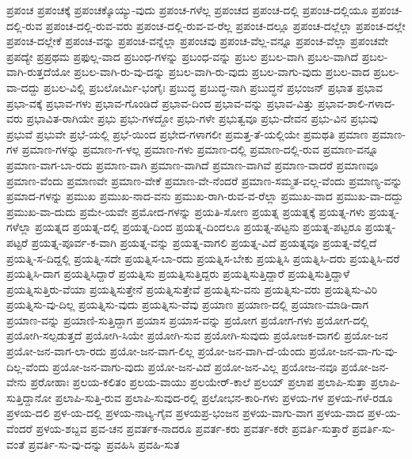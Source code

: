 ಪ್ರಪಂಚ
ಪ್ರಪಂಚಕ್ಕೆ
ಪ್ರಪಂಚಕ್ಕೊಯ್ಯು-ವುದು
ಪ್ರಪಂಚ-ಗಳೆಲ್ಲ
ಪ್ರಪಂಚದ
ಪ್ರಪಂಚ-ದಲ್ಲಿ
ಪ್ರಪಂಚ-ದಲ್ಲಿಯೂ
ಪ್ರಪಂಚ-ದಲ್ಲಿ-ರುವ
ಪ್ರಪಂಚ-ದಲ್ಲಿ-ರುವ-ವರು
ಪ್ರಪಂಚ-ದಲ್ಲಿ-ರುವ-ವ-ರೆಲ್ಲ
ಪ್ರಪಂಚ-ದಲ್ಲೂ
ಪ್ರಪಂಚ-ದಲ್ಲೆಲ್ಲಾ
ಪ್ರಪಂಚ-ದಲ್ಲೇ
ಪ್ರಪಂಚ-ದಲ್ಲೇಕೆ
ಪ್ರಪಂಚ-ವನ್ನು
ಪ್ರಪಂಚ-ವನ್ನೆಲ್ಲಾ
ಪ್ರಪಂಚವು
ಪ್ರಪಂಚ-ವೆಲ್ಲ-ವನ್ನೂ
ಪ್ರಪಂಚ-ವೆಲ್ಲಾ
ಪ್ರಪಂಚವೇ
ಪ್ರಪದ್ಯೇ
ಪ್ರಪ್ರಥಮ
ಪ್ರಫುಲ್ಲ-ವಾದ
ಪ್ರಬಂಧ-ಗಳನ್ನು
ಪ್ರಬಂಧ-ವನ್ನು
ಪ್ರಬಲ
ಪ್ರಬಲ-ವಾಗಿ
ಪ್ರಬಲ-ವಾಗಿದೆ
ಪ್ರಬಲ-ವಾಗಿ-ರುತ್ತದೆಯೋ
ಪ್ರಬಲ-ವಾಗಿ-ರು-ವು-ದನ್ನು
ಪ್ರಬಲ-ವಾಗಿ-ರು-ವುದು
ಪ್ರಬಲ-ವಾಗು-ವುದು
ಪ್ರಬಲ-ವಾದ
ಪ್ರಬಲ-ವಾ-ದದ್ದು
ಪ್ರಬಲ-ವಿಲ್ಲಿ
ಪ್ರಬಲೋರ್ಮಿ-ಭಂಗೈಃ
ಪ್ರಬುದ್ಧ
ಪ್ರಬುದ್ಧ-ನಾಗಿ
ಪ್ರಬುದ್ಧನೆ
ಪ್ರಭಂಜನ್
ಪ್ರಭಾತ
ಪ್ರಭಾವ
ಪ್ರಭಾ-ವಕ್ಕೆ
ಪ್ರಭಾವ-ಗಳು
ಪ್ರಭಾವ-ಗೊಂಡಿದೆ
ಪ್ರಭಾವ-ದಿಂದ
ಪ್ರಭಾವ-ವನ್ನು
ಪ್ರಭಾವ-ವಿತ್ತು
ಪ್ರಭಾವ-ಶಾಲಿ-ಗಳಾದ-ವರು
ಪ್ರಭಾವಿತ-ರಾಗಿಯೇ
ಪ್ರಭು
ಪ್ರಭು-ಗಳದ್ದೋ
ಪ್ರಭು-ಗಳೇ
ಪ್ರಭುತ್ವವೂ
ಪ್ರಭು-ದೇವನ
ಪ್ರಭು-ವಿನ
ಪ್ರಭುವು
ಪ್ರಭುವೆ
ಪ್ರಭುವೇ
ಪ್ರಭೆ-ಯಲ್ಲಿ
ಪ್ರಭೆ-ಯಿಂದ
ಪ್ರಭೇದ-ಗಳಾಗಲೀ
ಪ್ರಮತ್ತ-ತೆ-ಯಲ್ಲಿಯೇ
ಪ್ರಮಥತಿ
ಪ್ರಮಾಣ
ಪ್ರಮಾಣ-ಗಳ
ಪ್ರಮಾಣ-ಗಳನ್ನು
ಪ್ರಮಾಣ-ಗ-ಳಲ್ಲ
ಪ್ರಮಾಣ-ಗಳು
ಪ್ರಮಾಣ-ದಲ್ಲಿ
ಪ್ರಮಾಣ-ದಲ್ಲಿ-ರುವ
ಪ್ರಮಾಣ-ವನ್ನೂ
ಪ್ರಮಾಣ-ವಾಗ-ಬಾ-ರದು
ಪ್ರಮಾಣ-ವಾಗಿ
ಪ್ರಮಾಣ-ವಾಗಿದೆ
ಪ್ರಮಾಣ-ವಾಗಿವೆ
ಪ್ರಮಾಣ-ವಾದರೆ
ಪ್ರಮಾಣವೂ
ಪ್ರಮಾಣ-ವೆಂದು
ಪ್ರಮಾಣವೇ
ಪ್ರಮಾಣ-ವೇಕೆ
ಪ್ರಮಾಣ-ವೇ-ನೆಂದರೆ
ಪ್ರಮಾಣ-ಸಮ್ಮತ-ವಲ್ಲ-ವೆಂದು
ಪ್ರಮಾಣ್ಯ-ವನ್ನು
ಪ್ರಮಾದ-ಗಳನ್ನು
ಪ್ರಮುಖ
ಪ್ರಮುಖ-ನಾದ-ವನು
ಪ್ರಮುಖ-ರಾಗಿ-ರುವ-ವ-ರೆಲ್ಲಾ
ಪ್ರಮುಖ-ವಾದ
ಪ್ರಮುಖ-ವಾ-ದದ್ದು
ಪ್ರಮುಖ-ವಾ-ದುದು
ಪ್ರಮೇ-ಯವೇ
ಪ್ರಮೋದ-ಗಳನ್ನು
ಪ್ರಯತಿ-ಸೋಣ
ಪ್ರಯತ್ನ
ಪ್ರಯತ್ನಕ್ಕೆ
ಪ್ರಯತ್ನ-ಗಳು
ಪ್ರಯತ್ನ-ಗಳೆಲ್ಲಾ
ಪ್ರಯತ್ನದ
ಪ್ರಯತ್ನ-ದಲ್ಲಿ
ಪ್ರಯತ್ನ-ದಿಂದ
ಪ್ರಯತ್ನ-ದಿಂದಲೂ
ಪ್ರಯತ್ನ-ಪಟ್ಟನು
ಪ್ರಯತ್ನ-ಪಟ್ಟರೂ
ಪ್ರಯತ್ನ-ಪಟ್ಟರೆ
ಪ್ರಯತ್ನ-ಪೂರ್ವ-ಕ-ವಾಗಿ
ಪ್ರಯತ್ನ-ವನ್ನು
ಪ್ರಯತ್ನ-ವಾಗಲಿ
ಪ್ರಯತ್ನ-ವಿದೆ
ಪ್ರಯತ್ನವೂ
ಪ್ರಯತ್ನ-ವೆಲ್ಲಿದೆ
ಪ್ರಯತ್ನಿ-ಸ-ದಿದ್ದಲ್ಲಿ
ಪ್ರಯತ್ನಿ-ಸದೇ
ಪ್ರಯತ್ನಿಸ-ಬಾ-ರದು
ಪ್ರಯತ್ನಿಸ-ಬೇಕು
ಪ್ರಯತ್ನಿಸಿ
ಪ್ರಯತ್ನಿಸಿ-ದರು
ಪ್ರಯತ್ನಿಸಿ-ದರೆ
ಪ್ರಯತ್ನಿಸಿ-ದಾಗ
ಪ್ರಯತ್ನಿಸಿದ್ದಾರೆ
ಪ್ರಯತ್ನಿಸು
ಪ್ರಯತ್ನಿಸುತ್ತಿದ್ದರು
ಪ್ರಯತ್ನಿಸುತ್ತಿದ್ದಾರೆ
ಪ್ರಯತ್ನಿಸುತ್ತಿದ್ದಾಳೆ
ಪ್ರಯತ್ನಿಸುತ್ತಿರು-ವೆಯಾ
ಪ್ರಯತ್ನಿಸುತ್ತೇನೆ
ಪ್ರಯತ್ನಿಸುತ್ತೇವೆ
ಪ್ರಯತ್ನಿಸು-ವನು
ಪ್ರಯತ್ನಿಸು-ವರು
ಪ್ರಯತ್ನಿಸು-ವಿರಿ
ಪ್ರಯತ್ನಿಸು-ವು-ದಿಲ್ಲ
ಪ್ರಯತ್ನಿಸು-ವುದು
ಪ್ರಯತ್ನಿಸು-ವೆವು
ಪ್ರಯಾಣ
ಪ್ರಯಾಣ-ದಲ್ಲಿ
ಪ್ರಯಾಣ-ಮಾಡಿ-ದಾಗ
ಪ್ರಯಾಣ-ವನ್ನು
ಪ್ರಯಾಣಿ-ಸುತ್ತಿದ್ದಾಗ
ಪ್ರಯಾಸ
ಪ್ರಯಾಸ-ವನ್ನು
ಪ್ರಯೋಗ
ಪ್ರಯೋಗ-ಗಳು
ಪ್ರಯೋಗ-ದಲ್ಲಿ
ಪ್ರಯೋಗಿ-ಸಲ್ಪಡುತ್ತದೆ
ಪ್ರಯೋಗಿ-ಸಿಯೇ
ಪ್ರಯೋಗಿ-ಸುವ
ಪ್ರಯೋಗಿ-ಸುವುದು
ಪ್ರಯೋಜಕ-ವಾಗಲಿ
ಪ್ರಯೋ-ಜನ
ಪ್ರಯೋ-ಜನ-ವಾಗ-ಲಾ-ರದು
ಪ್ರಯೋ-ಜನ-ವಾಗ-ಲಿಲ್ಲ
ಪ್ರಯೋ-ಜನ-ವಾಗಿ-ದೆ-ಯೆಂದು
ಪ್ರಯೋ-ಜನ-ವಾ-ಗು-ವು-ದಿಲ್ಲ-ವೆಂದು
ಪ್ರಯೋ-ಜನ-ವಾಗು-ವುದು
ಪ್ರಯೋ-ಜನ-ವಿದೆ
ಪ್ರಯೋ-ಜನ-ವಿಲ್ಲ
ಪ್ರಯೋಜ-ನವೂ
ಪ್ರಯೋ-ಜನ-ವೇನು
ಪ್ರರೋಹಾಃ
ಪ್ರಲಯ-ಕಲಿತಂ
ಪ್ರಲಯ-ವಾಯು
ಪ್ರಲಯೇರ್‌-ಕಾಲೆ
ಪ್ರಲಯ್
ಪ್ರಲಾಪ
ಪ್ರಲಾಪಿ-ಸುತ್ತಾ
ಪ್ರಲಾಪಿ-ಸುತ್ತಿದ್ದಾನೋ
ಪ್ರಲಾಪಿ-ಸುತ್ತಿ-ರುವ
ಪ್ರಲಾಪಿ-ಸುವುದ-ರಲ್ಲಿ
ಪ್ರಲೋಭನ-ಕಾರಿ-ಗಳು
ಪ್ರಳಯ-ಗಳ
ಪ್ರಳಯ-ಗಳೆ-ರಡೂ
ಪ್ರಳಯ-ದಲಿ
ಪ್ರಳ-ಯ-ದಲ್ಲಿ
ಪ್ರಳಯ-ನಾಟ್ಯ-ಗೈವ
ಪ್ರಳಯಪ್ರ-ಭಂಜನ
ಪ್ರಳಯ-ವಾಗು-ವಾಗ
ಪ್ರಳಯ-ವಾದ
ಪ್ರಳ-ಯ-ವೆಂದರೆ
ಪ್ರಳಯ-ಶಬ್ದವ
ಪ್ರವ-ಚನ
ಪ್ರವರ್ತಕ-ನಾದರೂ
ಪ್ರವರ್ತ-ಕರು
ಪ್ರವರ್ತ-ಕರೇ
ಪ್ರವರ್ತಿ-ಸುತ್ತಾರೆ
ಪ್ರವರ್ತಿ-ಸು-ವಂತೆ
ಪ್ರವರ್ತಿ-ಸು-ವು-ದನ್ನು
ಪ್ರವಹಿಸಿ
ಪ್ರವಹಿ-ಸುತ
